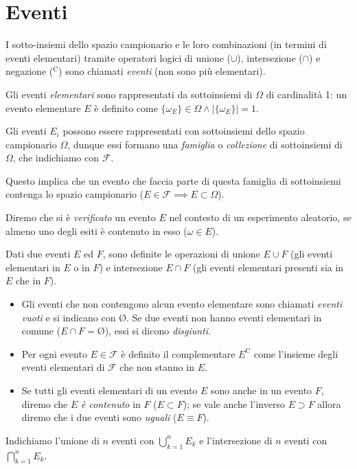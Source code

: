         \section{Eventi}\label{sec:Eventi}
        \begin{defn}
            I sotto-insiemi dello spazio campionario e le loro combinazioni (in termini di eventi elementari) tramite operatori logici di unione ($\cup$), intersezione ($\cap$) e negazione ($^{\text{C}}$) sono chiamati \textit{eventi} (non sono più elementari).
        \end{defn}
        \begin{obsv}
            Gli eventi \textit{elementari} sono rappresentati da sottoinsiemi di $\Omega$ di cardinalità 1: un evento elementare $E$ è definito come $\{\omega_E\} \in \Omega \land |\{\omega_E\}| = 1$.
        \end{obsv}
        \begin{defn}
            Gli eventi $E_i$ possono essere rappresentati con sottoinsiemi dello spazio campionario $\Omega$, dunque essi formano una \textit{famiglia} o \textit{collezione} di sottoinsiemi di $\Omega$, che indichiamo con $\mathscr{F}$.

            Questo implica che un evento che faccia parte di questa famiglia di sottoinsiemi contenga lo spazio campionario ($E \in \mathscr{F} \implies E \subset \Omega$).

            Diremo che si è \textit{verificato} un evento $E$ nel contesto di un esperimento aleatorio, se almeno uno degli esiti è contenuto in esso ($\omega \in E$).
        \end{defn}
        \begin{defn}
            Dati due eventi $E$ ed $F$, sono definite le operazioni di unione $E \cup F$ (gli eventi elementari in $E$ o in $F$) e intersezione $E \cap F$ (gli eventi elementari presenti sia in $E$ che in $F$).
            \begin{itemize}
                \item Gli eventi che non contengono alcun evento elementare sono chiamati \textit{eventi vuoti} e si indicano con \O. Se due eventi non hanno eventi elementari in comune ($E \cap F = \text{\O}$), essi si dicono \textit{disgiunti}.
                \item Per ogni evento $E \in \mathscr{F}$ è definito il complementare $E^{\text{C}}$ come l'insieme degli eventi elementari di $\mathscr{F}$ che non stanno in $E$.
                \item Se tutti gli eventi elementari di un evento $E$ sono anche in un evento  $F$, diremo che $E$ \textit{è contenuto} in  $F$ ($E \subset F$); se vale anche l'inverso $E \supset F$ allora diremo che i due eventi sono \textit{uguali} ($E \equiv F$).
            \end{itemize}
            Indichiamo l'unione di $n$ eventi con  $\bigcup_{k=1}^{n} E_k$ e l'intersezione di  $n$ eventi con $\bigcap_{k=1}^{n} E_k$.
        \end{defn}
